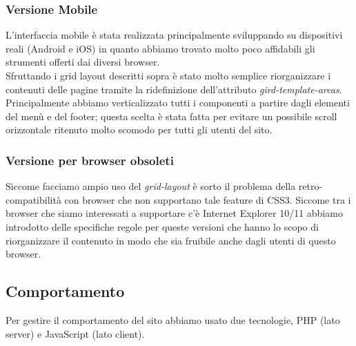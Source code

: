 \documentclass[1_relazione.tex]{subfiles}
\begin{document}
\subsubsection{Versione Mobile}
L'interfaccia mobile è stata realizzata principalmente sviluppando su dispositivi reali (Android e iOS) in quanto abbiamo trovato molto poco affidabili gli strumenti offerti dai diversi browser.\\
Sfruttando i grid layout descritti sopra è stato molto semplice riorganizzare i contenuti delle pagine tramite la ridefinizione dell'attributo \textit{gird-template-areas}.\\
Principalmente abbiamo verticalizzato tutti i componenti a partire dagli elementi del menù e del footer; questa scelta è stata fatta per evitare un possibile scroll orizzontale ritenuto molto scomodo per tutti gli utenti del sito.\\

\subsubsection{Versione per browser obsoleti}
Siccome facciamo ampio uso del \textit{grid-layout} è sorto il problema della retro-compatibilità con browser che non supportano tale feature di CSS3. Siccome tra i browser che siamo interessati a supportare c'è Internet Explorer 10/11 abbiamo introdotto delle specifiche regole per queste versioni che hanno lo scopo di riorganizzare il contenuto in modo che sia fruibile anche dagli utenti di questo browser.

\subsection{Comportamento}
Per gestire il comportamento del sito abbiamo usato due tecnologie, PHP (lato server) e JavaScript (lato client).
\end{document}
